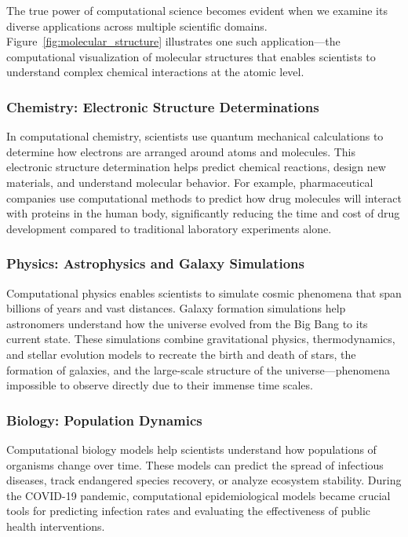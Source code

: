 The true power of computational science becomes evident when we examine its diverse applications across multiple scientific domains. Figure~\ref{fig:molecular_structure} illustrates one such application—the computational visualization of molecular structures that enables scientists to understand complex chemical interactions at the atomic level.

\subsubsection{Chemistry: Electronic Structure Determinations}

In computational chemistry, scientists use quantum mechanical calculations to determine how electrons are arranged around atoms and molecules. This electronic structure determination helps predict chemical reactions, design new materials, and understand molecular behavior. For example, pharmaceutical companies use computational methods to predict how drug molecules will interact with proteins in the human body, significantly reducing the time and cost of drug development compared to traditional laboratory experiments alone.

\subsubsection{Physics: Astrophysics and Galaxy Simulations}

Computational physics enables scientists to simulate cosmic phenomena that span billions of years and vast distances. Galaxy formation simulations help astronomers understand how the universe evolved from the Big Bang to its current state. These simulations combine gravitational physics, thermodynamics, and stellar evolution models to recreate the birth and death of stars, the formation of galaxies, and the large-scale structure of the universe—phenomena impossible to observe directly due to their immense time scales.

\subsubsection{Biology: Population Dynamics}

Computational biology models help scientists understand how populations of organisms change over time. These models can predict the spread of infectious diseases, track endangered species recovery, or analyze ecosystem stability. During the COVID-19 pandemic, computational epidemiological models became crucial tools for predicting infection rates and evaluating the effectiveness of public health interventions.


